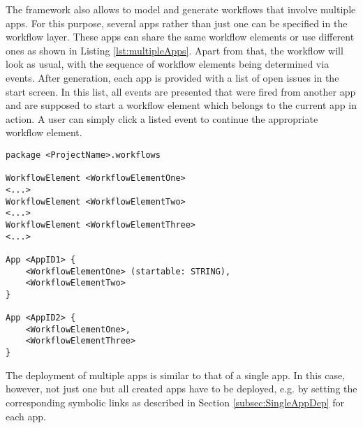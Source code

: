 
The \MD framework also allows to model and generate workflows that involve multiple apps. For this purpose, several apps rather than just one can be specified in the workflow layer. These apps can share the same workflow elements or use different ones as shown in Listing \ref{lst:multipleApps}. Apart from that, the workflow will look as usual, with the sequence of workflow elements being determined via events. After generation, each app is provided with a list of open issues in the start screen. In this list, all events are presented that were fired from another app and are supposed to start a workflow element which belongs to the current app in action. A user can simply click a listed event to continue the appropriate workflow element.

\begin{lstlisting}[language=MD2, label=lst:multipleApps, caption=Workflow Definition for Multiple Apps]
package <ProjectName>.workflows

WorkflowElement <WorkflowElementOne>
<...>
WorkflowElement <WorkflowElementTwo>
<...>
WorkflowElement <WorkflowElementThree>
<...>

App <AppID1> {
	<WorkflowElementOne> (startable: STRING),
	<WorkflowElementTwo>
}

App <AppID2> {
	<WorkflowElementOne>,
	<WorkflowElementThree>
}
\end{lstlisting}

The deployment of multiple apps is similar to that of a single app. In this case, however, not just one but all created apps have to be deployed, e.g. by setting the corresponding symbolic links as described in Section \ref{subsec:SingleAppDep} for each app.
